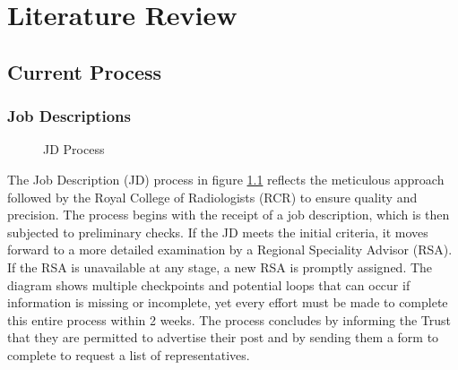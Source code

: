 \chapter{Literature Review}
\section{Current Process}
\subsection{Job Descriptions}
\begin{figure}[h]
\centering
{}
\vspace{-20pt}
\caption{JD Process}
\label{fig:jd}
\end{figure}
\vspace{-5pt}
The Job Description (JD) process in figure \ref{fig:jd} reflects the meticulous approach followed by the Royal College of Radiologists (RCR) to ensure quality and precision. The process begins with the receipt of a job description, which is then subjected to preliminary checks. If the JD meets the initial criteria, it moves forward to a more detailed examination by a Regional Speciality Advisor (RSA). If the RSA is unavailable at any stage, a new RSA is promptly assigned. The diagram shows multiple checkpoints and potential loops that can occur if information is missing or incomplete, yet every effort must be made to complete this entire process within 2 weeks. The process concludes by informing the Trust that they are permitted to advertise their post and by sending them a form to complete to request a list of representatives.

